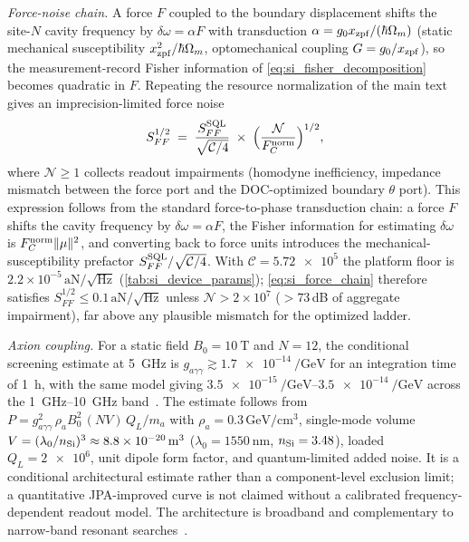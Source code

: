 \documentclass[aps,prxquantum,preprint,superscriptaddress,amsmath,amssymb]{revtex4-2}
\newcommand{\Fnorm}{F_C^{\rm norm}}
\begin{document}
\textit{Force-noise chain.} A force $F$ coupled to the boundary displacement shifts the site-$N$ cavity frequency by $\delta\omega=\alpha F$ with transduction $\alpha=g_0x_{\rm zpf}/(\hbar\Omega_m)$ (static mechanical susceptibility $x_{\rm zpf}^2/\hbar\Omega_m$, optomechanical coupling $G=g_0/x_{\rm zpf}$), so the measurement-record Fisher information of \cref{eq:si_fisher_decomposition} becomes quadratic in $F$. Repeating the resource normalization of the main text gives an imprecision-limited force noise
\begin{equation}\label{eq:si_force_chain}
S_{FF}^{1/2}\;=\;\frac{S_{FF}^{\rm SQL}}{\sqrt{\mathcal{C}/4}}\;\times\;\Bigl(\frac{\mathcal{N}}{\Fnorm}\Bigr)^{1/2},
\end{equation}
where $\mathcal{N}\ge1$ collects readout impairments (homodyne inefficiency, impedance mismatch between the force port and the DOC-optimized boundary $\theta$ port). This expression follows from the standard force-to-phase transduction chain: a force $F$ shifts the cavity frequency by $\delta\omega=\alpha F$, the Fisher information for estimating $\delta\omega$ is $\Fnorm\|\mu\|^2$, and converting back to force units introduces the mechanical-susceptibility prefactor $S_{FF}^{\rm SQL}/\sqrt{\mathcal{C}/4}$. With $\mathcal{C}=\num{5.72e5}$ the platform floor is $2.2\times10^{-5}\,\mathrm{aN}/\sqrt{\mathrm{Hz}}$ (\cref{tab:si_device_params}); \cref{eq:si_force_chain} therefore satisfies $S_{FF}^{1/2}\le\num{0.1}\,\mathrm{aN}/\sqrt{\mathrm{Hz}}$ unless $\mathcal{N}>2\times10^{7}$ ($>73$\,dB of aggregate impairment), far above any plausible mismatch for the optimized ladder.

\textit{Axion coupling.} For a static field $B_0=\qty{10}{\tesla}$ and $N=\num{12}$, the conditional screening estimate at \qty{5}{\giga\hertz} is $g_{a\gamma\gamma}\gtrsim\qty{1.7e-14}{\per\giga\electronvolt}$ for an integration time of \qty{1}{\hour}, with the same model giving $\qtyrange{3.5e-15}{3.5e-14}{\per\giga\electronvolt}$ across the \qtyrange{1}{10}{\giga\hertz} band~\citep{Sikivie1983,Graham2015}. The estimate follows from $P=g_{a\gamma\gamma}^{2}\,\rho_a B_0^{2}\,(N V)\,Q_{L}/m_a$ with $\rho_a=\num{0.3}\,\mathrm{GeV}/\mathrm{cm}^{3}$, single-mode volume $V=(\lambda_0/n_{\rm Si})^{3}\approx\num{8.8e-20}\,\mathrm{m}^{3}$ ($\lambda_0=\qty{1550}{\nano\meter}$, $n_{\rm Si}=\num{3.48}$), loaded $Q_L=\num{2e6}$, unit dipole form factor, and quantum-limited added noise. It is a conditional architectural estimate rather than a component-level exclusion limit; a quantitative JPA-improved curve is not claimed without a calibrated frequency-dependent readout model. The architecture is broadband and complementary to narrow-band resonant searches~\citep{CAST2017,ADMX2023,HAYSTAC2024}.
\end{document}

